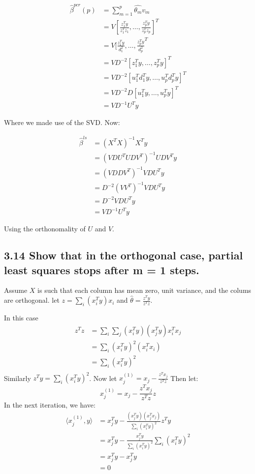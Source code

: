 \begin{align*}
    \hat{\beta}^{pcr}(p) &= \sum_{m=1}^{p} \hat{\theta_m} v_m\\
    &= V [\frac{z_1^T y}{z_1^T z_1}, \dots, \frac{z_p^T y}{z_p^T z_p}]^T\\
    &= V [\frac{z_1^T y}{d_1^2}, \dots, \frac{z_p^T y}{d_p^2}^T\\
    &= V D^{-2}[z_1^T y, \dots, z_p^T y]^T\\
    &= V D^{-2}[u_1^T d_1^T y, \dots, u_p^T d_p^T y]^T\\
    &= V D^{-2} D [u_1^T y, \dots, u_p^T y]^T\\
    &= V D^{-1} U^T y
\end{align*}

Where we made use of the SVD. Now: 

\begin{align*}
    \hat{\beta}^{ls} &= \left(X^T X\right)^{-1} X^T y \\
    &= \left(V D U^T U D V^T\right)^{-1} U D V^T y\\
    &= \left(V D D V^T\right)^{-1} V D U^T y\\
    &= D^{-2}\left(V V^T\right)^{-1} V D U^T y\\
    &= D^{-2} V D U^T y\\
    &= V D^{-1} U^T y
\end{align*}

Using the orthonomality of $U$ and $V$.

\subsection*{3.14 Show that in the orthogonal case, partial least squares stops after m = 1 steps.}

Assume $X$ is such that each column has mean zero, unit variance, and the colums are orthogonal.
let $z = \sum_i \left(x_i^T y\right) x_i$ and $\hat{\theta} = \frac{z^T y} {z^T z}$.

In this case 
\begin{align*}
    z^T z &= \sum_i \sum_j \left(x_i^T y\right)\left(x_j^T y\right) x_i^T x_j\\
    &= \sum_i \left(x_i^T y\right)^2 \left(x_i^T x_i\right)\\
    &= \sum_i \left(x_i^T y\right)^2\\
\end{align*}
Similarly $z^T y = \sum_i \left(x_i^T y\right)^2$. Now let $x_j^{(1)} = x_j - \frac{z^T x_j}{z^T z}$
Then let:
$$ x_j^{(1)} = x_j - \frac{z^T x_j}{ z^T z}z$$
In the next iteration, we have:
\begin{align*}
    \langle x_j^{(1)}, y\rangle &= x_j^T y - \frac{\left(x_j^T y\right) \left(x_j^T x_j\right)}{ \sum_i \left(x_i^T y\right)^2}z^T y\\
     &= x_j^T y - \frac{x_j^T y }{ \sum_i \left(x_i^T y\right)^2 }\sum_i \left(x_i^T y\right)^2\\
    &= x_j^T y - x_j^T y\\
    &= 0
\end{align*}

